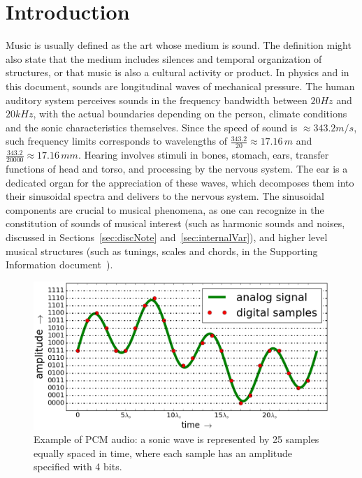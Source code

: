 \section{Introduction}\label{sec:level1}
Music is usually defined as the art whose medium is sound.
The definition might also state that the medium includes silences
and temporal organization of structures, or that music
is also a cultural activity or product.
In physics and in this document, sounds are longitudinal waves of mechanical pressure.
The human auditory system perceives sounds in the frequency bandwidth between $20Hz$ and $20kHz$,
with the actual boundaries depending on the person,
climate conditions and the sonic characteristics themselves.
Since the speed of sound is $\approx 343.2 m/s$,
such frequency limits corresponds to  wavelengths of $\frac{343.2}{20} \approx 17.16\,m$ and
$\frac{343.2}{20000} \approx 17.16\,mm$.
Hearing involves stimuli in bones, stomach, ears,
transfer functions of head and torso,
and processing by the nervous system.
The ear is a dedicated organ for the appreciation of these waves,
which decomposes them into their sinusoidal spectra and delivers to the nervous system.
The sinusoidal components are crucial to musical phenomena,
as one can recognize in the constitution of sounds of musical interest
(such as harmonic sounds and noises, discussed in Sections~\ref{sec:discNote} and~\ref{sec:internalVar}),
and higher level musical structures (such as tunings, scales and chords, in the Supporting Information document~\cite{massNotesInMusic}).~\cite{Roederer}

\begin{figure}[!h]
    \centering
        \includegraphics[width=.7\textwidth]{figures/pcm_}
	\caption{Example of PCM audio:
	a sonic wave is represented by 25 samples equally spaced in time, where each sample has an amplitude specified with 4 bits.}
        \label{fig:PCM}
\end{figure}

